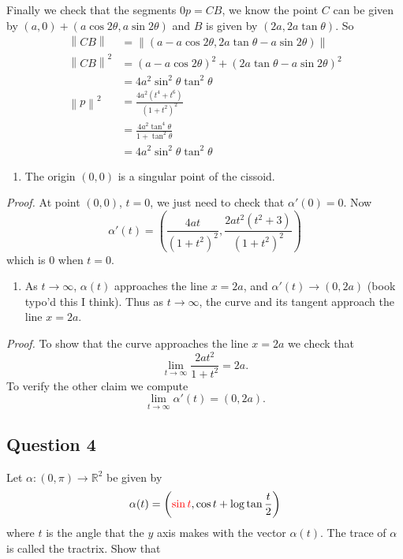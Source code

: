 \documentclass[12pt]{article}
\begin{document}
Finally we check that the segments \(0p = CB\), we know the point \(C\)
can be given by \((a,0) + (a \cos 2\theta, a \sin 2\theta)\) and \(B\)
is given by \((2a, 2a\tan\theta )\). So \begin{align*}
\left\lVert CB \right\rVert &= \left\lVert \left(  a - a\cos 2\theta, 2a\tan\theta - a\sin 2\theta  \right) \right\rVert \\
\left\lVert CB \right\rVert^2 &=
(a - a\cos2\theta)^2 + (2a\tan\theta - a\sin2\theta)^2 \\
&= 4a^2\sin^2\theta\tan^2\theta \\
\left\lVert p \right\rVert^2 &= \frac{4a^2(t^4 + t^6)}{(1+t^2)^2} \\
&= \frac{4a^2 \tan^4\theta}{1+\tan^2\theta} \\
&= 4a^2\sin^2\theta\tan^2\theta
\end{align*}

\begin{enumerate}
\def\labelenumi{\alph{enumi}.}
\setcounter{enumi}{1}
\item
  The origin \((0,0)\) is a singular point of the cissoid.
\end{enumerate}

\emph{Proof.} At point \((0,0)\), \(t = 0\), we just need to check that
\(\alpha'(0) = 0\). Now
\[ \alpha'(t) = \left( \frac{4a t}{(1+t^2)^2}, \frac{2a t^2(t^2 + 3)}{(1+t^2)^2}  \right) \]
which is \(0\) when \(t = 0\).

\begin{enumerate}
\def\labelenumi{\alph{enumi}.}
\setcounter{enumi}{2}
\item
  As \(t\to\infty\), \(\alpha(t)\) approaches the line \(x = 2a\), and
  \(\alpha'(t) \to (0, 2a)\) (book typo'd this I think). Thus as
  \(t\to\infty\), the curve and its tangent approach the line
  \(x = 2a\).
\end{enumerate}

\emph{Proof.} To show that the curve approaches the line \(x=2a\) we
check that \[ \lim_{t\to\infty} \frac{2at^2}{1+t^2} = 2a. \] To verify
the other claim we compute \[ \lim_{t\to\infty} \alpha'(t) = (0, 2a). \]


\subsection*{Question 4}

Let $\alpha : (0, \pi) \to \mathbb R^2$ be given by
$$\alpha(t) = \left ({\color{red}\sin t}, \cos t + \log \tan \frac t2\right )$$
where $t$ is the angle that the $y$ axis makes with the vector $\alpha(t)$. The trace of $\alpha$ is
called the tractrix. 
Show that
\end{document}
